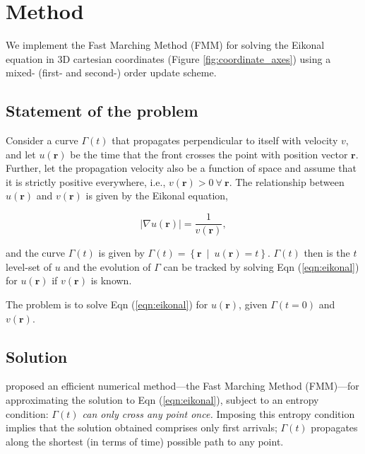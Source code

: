 \section{Method}
	We implement the Fast Marching Method (FMM) for solving the Eikonal equation in 3D cartesian coordinates (Figure \ref{fig:coordinate_axes}) using a mixed- (first- and second-) order update scheme.
	\par
	
	

	\subsection{Statement of the problem}
		Consider a curve $\Gamma\left(t\right)$ that propagates perpendicular to itself with velocity $v$, and let $u\left(\mathbf{r}\right)$ be the time that the front crosses the point with position vector $\mathbf{r}$. Further, let the propagation velocity also be a function of space and assume that it is strictly positive everywhere, i.e., $v\left(\mathbf{r}\right) > 0 \ \forall\ \mathbf{r}$. The relationship between $u\left(\mathbf{r}\right)$ and $v\left(\mathbf{r}\right)$ is given by the Eikonal equation,
		
		\begin{equation}
			\label{eqn:eikonal}
			\left|\nabla u\left(\mathbf{r}\right)\right| = \frac{1}{v\left(\mathbf{r}\right)},
		\end{equation}
		
		\noindent and the curve $\Gamma\left(t\right)$ is given by $\Gamma\left(t\right) = \left\{\mathbf{r}\ \mid\ u\left(\mathbf{r}\right) = t\right\}$. $\Gamma\left(t\right)$ then is the $t$ level-set of $u$ and the evolution of $\Gamma$ can be tracked by solving Eqn (\ref{eqn:eikonal}) for $u\left(\mathbf{r}\right)$ if $v\left(\mathbf{r}\right)$ is known.
		\par
		
		The problem is to solve Eqn (\ref{eqn:eikonal}) for $u\left(\mathbf{r}\right)$, given $\Gamma\left(t=0\right)$ and $v\left(\mathbf{r}\right)$.
	
	\subsection{Solution}
		 proposed an efficient numerical method---the Fast Marching Method (FMM)---for approximating the solution to Eqn (\ref{eqn:eikonal}), subject to an entropy condition: \textit{$\Gamma\left(t\right)$ can only cross any point once.} Imposing this entropy condition implies that the solution obtained comprises only first arrivals; $\Gamma\left(t\right)$ propagates along the shortest (in terms of time) possible path to any point.
		\par
		

